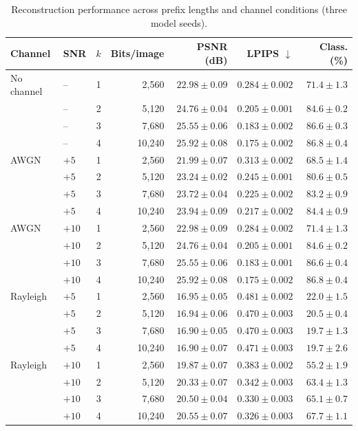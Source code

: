 \documentclass[letterpaper,journal]{IEEEtran}
\begin{document}
\begin{table}[!t]
\centering
\caption{Reconstruction performance across prefix lengths and channel conditions (three model seeds).}
\label{tab:progressive}
\scriptsize
\setlength{\tabcolsep}{4pt}
\begin{tabular}{@{}llrrrrr@{}}
\toprule
Channel & SNR & $k$ & Bits/image & PSNR (dB) & LPIPS $\downarrow$ & Class. (\%) \\ \midrule
No channel & -- & 1 & 2,560 & $22.98\pm0.09$ & $0.284\pm0.002$ & $71.4\pm1.3$ \\
& -- & 2 & 5,120 & $24.76\pm0.04$ & $0.205\pm0.001$ & $84.6\pm0.2$ \\
& -- & 3 & 7,680 & $25.55\pm0.06$ & $0.183\pm0.002$ & $86.6\pm0.3$ \\
& -- & 4 & 10,240 & $25.92\pm0.08$ & $0.175\pm0.002$ & $86.8\pm0.4$ \\ \midrule
AWGN & $+5$ & 1 & 2,560 & $21.99\pm0.07$ & $0.313\pm0.002$ & $68.5\pm1.4$ \\
& $+5$ & 2 & 5,120 & $23.24\pm0.02$ & $0.245\pm0.001$ & $80.6\pm0.5$ \\
& $+5$ & 3 & 7,680 & $23.72\pm0.04$ & $0.225\pm0.002$ & $83.2\pm0.9$ \\
& $+5$ & 4 & 10,240 & $23.94\pm0.09$ & $0.217\pm0.002$ & $84.4\pm0.9$ \\
AWGN & $+10$ & 1 & 2,560 & $22.98\pm0.09$ & $0.284\pm0.002$ & $71.4\pm1.3$ \\
& $+10$ & 2 & 5,120 & $24.76\pm0.04$ & $0.205\pm0.001$ & $84.6\pm0.2$ \\
& $+10$ & 3 & 7,680 & $25.55\pm0.06$ & $0.183\pm0.001$ & $86.6\pm0.4$ \\
& $+10$ & 4 & 10,240 & $25.92\pm0.08$ & $0.175\pm0.002$ & $86.8\pm0.4$ \\ \midrule
Rayleigh & $+5$ & 1 & 2,560 & $16.95\pm0.05$ & $0.481\pm0.002$ & $22.0\pm1.5$ \\
& $+5$ & 2 & 5,120 & $16.94\pm0.06$ & $0.470\pm0.003$ & $20.5\pm0.4$ \\
& $+5$ & 3 & 7,680 & $16.90\pm0.05$ & $0.470\pm0.003$ & $19.7\pm1.3$ \\
& $+5$ & 4 & 10,240 & $16.90\pm0.07$ & $0.471\pm0.003$ & $19.7\pm2.6$ \\
Rayleigh & $+10$ & 1 & 2,560 & $19.87\pm0.07$ & $0.383\pm0.002$ & $55.2\pm1.9$ \\
& $+10$ & 2 & 5,120 & $20.33\pm0.07$ & $0.342\pm0.003$ & $63.4\pm1.3$ \\
& $+10$ & 3 & 7,680 & $20.50\pm0.04$ & $0.330\pm0.003$ & $65.1\pm0.7$ \\
& $+10$ & 4 & 10,240 & $20.55\pm0.07$ & $0.326\pm0.003$ & $67.7\pm1.1$ \\ \bottomrule
\end{tabular}
\end{table}
\end{document}
